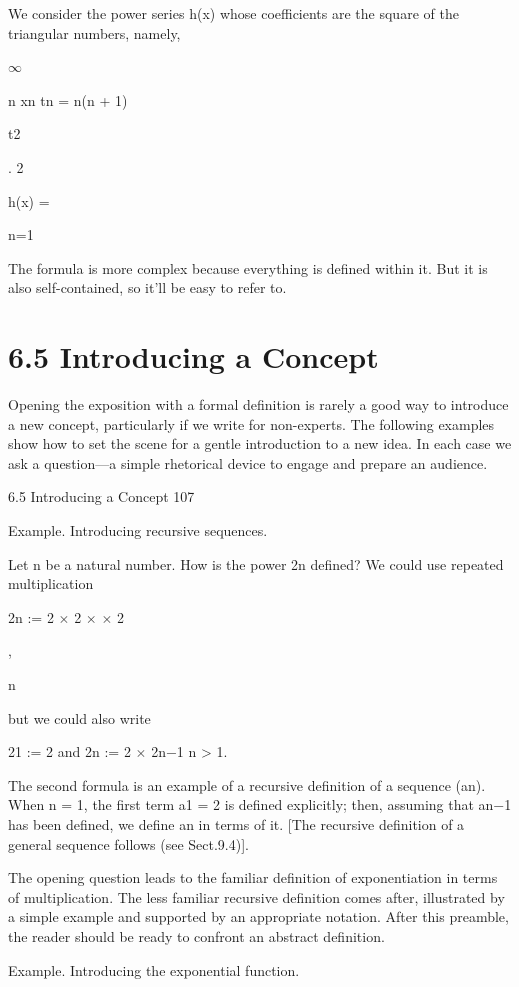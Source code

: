\documentclass[11pt]{article}
\theoremstyle{plain}
\theoremstyle{definition}
\begin{document}
We consider the power series h(x) whose coefficients are the square of the triangular numbers, namely,

$\infty$

n xn tn = n(n + 1)

t2

. 2

h(x) =

n=1

The formula is more complex because everything is defined within it. But it is also self-contained, so it'll be easy to refer to.

\section{6.5 Introducing a Concept}

Opening the exposition with a formal definition is rarely a good way to introduce a new concept, particularly if we write for non-experts. The following examples show how to set the scene for a gentle introduction to a new idea. In each case we ask a question---a simple rhetorical device to engage and prepare an audience.

6.5 Introducing a Concept 107

Example. Introducing recursive sequences.

Let n be a natural number. How is the power 2n defined? We could use repeated multiplication

2n := 2 $\times$ 2 $\times$ \textperiodcentered{} \textperiodcentered{} \textperiodcentered{} $\times$ 2

,

n

but we could also write

21 := 2 and 2n := 2 $\times$ 2n$-$1 n > 1.

The second formula is an example of a recursive definition of a sequence (an). When n = 1, the first term a1 = 2 is defined explicitly; then, assuming that an$-$1 has been defined, we define an in terms of it. [The recursive definition of a general sequence follows (see Sect.9.4)].

The opening question leads to the familiar definition of exponentiation in terms of multiplication. The less familiar recursive definition comes after, illustrated by a simple example and supported by an appropriate notation. After this preamble, the reader should be ready to confront an abstract definition.

Example. Introducing the exponential function.
\end{document}
